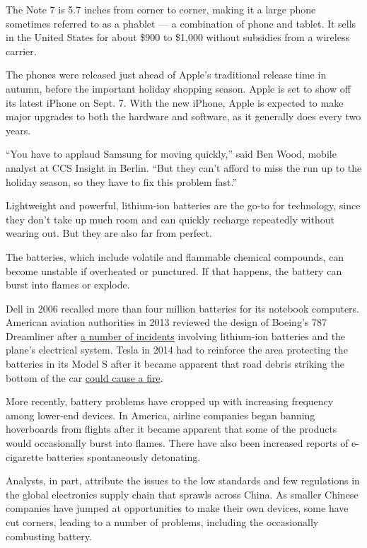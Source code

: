 The Note 7 is 5.7 inches from corner to corner, making it a large phone
sometimes referred to as a phablet --- a combination of phone and
tablet. It sells in the United States for about \$900 to \$1,000 without
subsidies from a wireless carrier.

The phones were released just ahead of Apple's traditional release time
in autumn, before the important holiday shopping season. Apple is set to
show off its latest iPhone on Sept. 7. With the new iPhone, Apple is
expected to make major upgrades to both the hardware and software, as it
generally does every two years.

``You have to applaud Samsung for moving quickly,'' said Ben Wood,
mobile analyst at CCS Insight in Berlin. ``But they can't afford to miss
the run up to the holiday season, so they have to fix this problem
fast.''

Lightweight and powerful, lithium-ion batteries are the go-to for
technology, since they don't take up much room and can quickly recharge
repeatedly without wearing out. But they are also far from perfect.

The batteries, which include volatile and flammable chemical compounds,
can become unstable if overheated or punctured. If that happens, the
battery can burst into flames or explode.

Dell in 2006 recalled more than four million batteries for its notebook
computers. American aviation authorities in 2013 reviewed the design of
Boeing's 787 Dreamliner after
\href{http://www.nytimes3xbfgragh.onion/2013/04/06/business/boeing-completes-test-787-flight.html}{a
number of incidents} involving lithium-ion batteries and the plane's
electrical system. Tesla in 2014 had to reinforce the area protecting
the batteries in its Model S after it became apparent that road debris
striking the bottom of the car
\href{http://www.nytimes3xbfgragh.onion/2013/10/04/business/car-fire-a-test-for-high-flying-tesla.html}{could
cause a fire}.

More recently, battery problems have cropped up with increasing
frequency among lower-end devices. In America, airline companies began
banning hoverboards from flights after it became apparent that some of
the products would occasionally burst into flames. There have also been
increased reports of e-cigarette batteries spontaneously detonating.

Analysts, in part, attribute the issues to the low standards and few
regulations in the global electronics supply chain that sprawls across
China. As smaller Chinese companies have jumped at opportunities to make
their own devices, some have cut corners, leading to a number of
problems, including the occasionally combusting battery.

